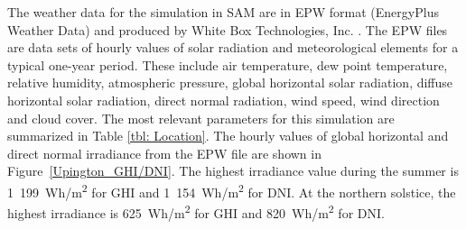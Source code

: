 The weather data for the simulation in SAM are in EPW format (EnergyPlus Weather Data) and produced by White Box Technologies, Inc. \cite{WhiteBoxTechnologies2015}. The EPW files are data sets of hourly values of solar radiation and meteorological elements for a typical one-year period. These include air temperature, dew point temperature, relative humidity, atmospheric pressure, global horizontal solar radiation, diffuse horizontal solar radiation, direct normal radiation, wind speed, wind direction and cloud cover. The most relevant parameters for this simulation are summarized in Table \ref{tbl: Location}. The hourly values of global horizontal and direct normal irradiance from the EPW file are shown in Figure~\ref{Upington_GHI/DNI}. The highest irradiance value during the summer is 1~199~Wh/m\textsuperscript{2} for GHI and 1~154~Wh/m\textsuperscript{2} for DNI. At the northern solstice, the highest irradiance is 625~Wh/m\textsuperscript{2} for GHI and 820~Wh/m\textsuperscript{2} for DNI.


